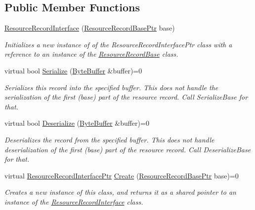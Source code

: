 \subsection*{Public Member Functions}
\begin{DoxyCompactItemize}
\item 
\hyperlink{class_senergy_1_1_dns_1_1_resource_record_interface_a8e4eb71ac27838d547e48a171774142f}{Resource\-Record\-Interface} (\hyperlink{namespace_senergy_1_1_dns_a72915c893fbf242018e79d8f92e1646b}{Resource\-Record\-Base\-Ptr} base)
\begin{DoxyCompactList}\small\item\em Initializes a new instance of of the Resource\-Record\-Interface\-Ptr class with a reference to an instance of the \hyperlink{class_senergy_1_1_dns_1_1_resource_record_base}{Resource\-Record\-Base} class. \end{DoxyCompactList}\item 
virtual bool \hyperlink{class_senergy_1_1_dns_1_1_resource_record_interface_ab81e0a7ea292513c5c34a3be0c7a6dca}{Serialize} (\hyperlink{class_senergy_1_1_byte_buffer}{Byte\-Buffer} \&buffer)=0
\begin{DoxyCompactList}\small\item\em Serializes this record into the specified buffer. This does not handle the serialization of the first (base) part of the resource record. Call Serialize\-Base for that. \end{DoxyCompactList}\item 
virtual bool \hyperlink{class_senergy_1_1_dns_1_1_resource_record_interface_ade2e0b9817476ea2161b694efd3e02db}{Deserialize} (\hyperlink{class_senergy_1_1_byte_buffer}{Byte\-Buffer} \&buffer)=0
\begin{DoxyCompactList}\small\item\em Deserializes the record from the specified buffer. This does not handle deserialization of the first (base) part of the resource record. Call Deserialize\-Base for that. \end{DoxyCompactList}\item 
virtual \hyperlink{class_senergy_1_1_dns_1_1_resource_record_interface_abf5eec20c95f05b57c5c02eaed349e16}{Resource\-Record\-Interface\-Ptr} \hyperlink{class_senergy_1_1_dns_1_1_resource_record_interface_abe37068b670f89481a145e1e9c2c8267}{Create} (\hyperlink{namespace_senergy_1_1_dns_a72915c893fbf242018e79d8f92e1646b}{Resource\-Record\-Base\-Ptr} base)=0
\begin{DoxyCompactList}\small\item\em Creates a new instance of this class, and returns it as a shared pointer to an instance of the \hyperlink{class_senergy_1_1_dns_1_1_resource_record_interface}{Resource\-Record\-Interface} class. \end{DoxyCompactList}\item 

\end{DoxyCompactItemize}
